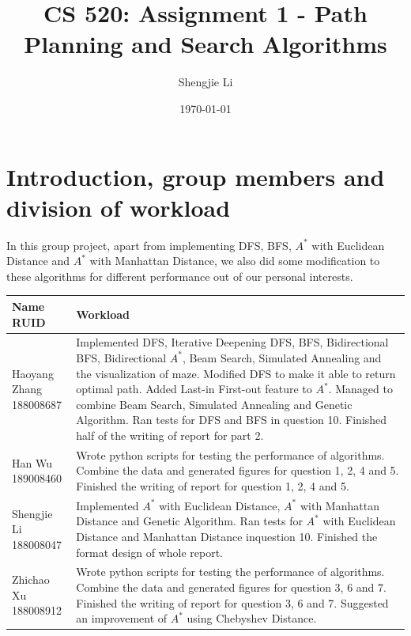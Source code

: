 \documentclass[letter]{article}
\title{CS 520: Assignment 1 - Path Planning and Search Algorithms}
\author{Shengjie Li}
\date{\today}
\begin{document}
\maketitle

\section{Introduction, group members and division of workload}
\label{sec:Introduction}

In this group project, apart from implementing DFS, BFS, $ A^* $ with Euclidean Distance and $ A^* $ with Manhattan Distance, we also did some modification to these algorithms for different performance out of our personal interests.  \\
\begin{tabular}{| p{2.5cm} | p{11.5cm} |}
	\hline
	\makecell[c]{Name \\ RUID} & Workload \\
	\hline
	\makecell[c]{Haoyang Zhang \\ 188008687} & {Implemented DFS, Iterative Deepening DFS, BFS, Bidirectional BFS, Bidirectional $ A^* $, Beam Search, Simulated Annealing and the visualization of maze. Modified DFS to make it able to return optimal path. Added Last-in First-out feature to $ A^* $. Managed to combine Beam Search, Simulated Annealing and Genetic Algorithm. Ran tests for DFS and BFS in question 10. Finished half of the writing of report for part 2.} \\
	\hline
	\makecell[c]{Han Wu \\ 189008460} & {Wrote python scripts for testing the performance of algorithms. Combine the data and generated figures for question 1, 2, 4 and 5. Finished the writing of report for question 1, 2, 4 and 5.} \\
	\hline
	\makecell[c]{Shengjie Li \\ 188008047} & {Implemented $ A^* $ with Euclidean Distance, $ A^* $ with Manhattan Distance and Genetic Algorithm. Ran tests for $ A^* $ with Euclidean Distance and Manhattan Distance inquestion 10. Finished the format design of whole report. } \\
	\hline
	\makecell[c]{Zhichao Xu \\ 188008912} & {Wrote python scripts for testing the performance of algorithms. Combine the data and generated figures for question 3, 6 and 7. Finished the writing of report for question 3, 6 and 7. Suggested an improvement of $ A^* $ using Chebyshev Distance.} \\
	\hline
\end{tabular}
\end{document}
